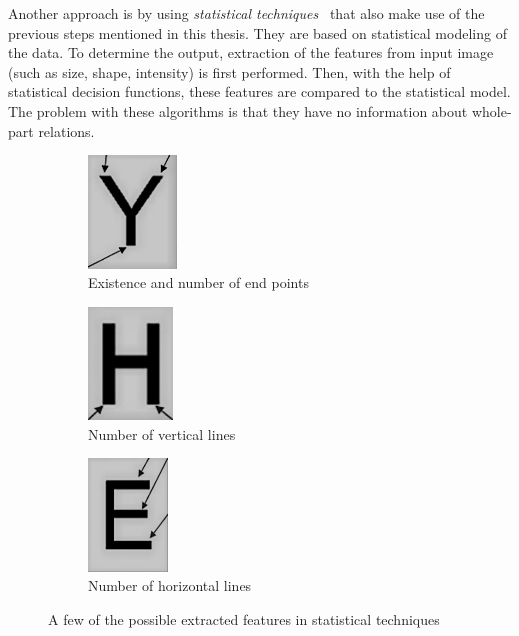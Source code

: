 Another approach is by using \emph{statistical techniques}~\citep{characterClassification} that also make use of the previous steps mentioned in this thesis. They are based on statistical modeling of the data. To determine the output, extraction of the features from input image (such as size, shape, intensity) is first performed. Then, with the help of statistical decision functions, these features are compared to the statistical model. The problem with these algorithms is that they have no information about whole-part relations. 

\begin{figure}[H]
\hspace*{\fill} %
\begin{subfigure}{0.30\textwidth}
\includegraphics[width=\linewidth,height=30mm]{img/statis_endPoint.jpg}
\caption{Existence and number of end points} \label{fig:1b}
\end{subfigure}
\hspace*{\fill} %
\begin{subfigure}{0.30\textwidth}
\includegraphics[width=\linewidth,height=30mm]{img/statis_vertical.jpg}
\caption{Number of vertical lines} \label{fig:1c}
\end{subfigure}
\begin{subfigure}{0.30\textwidth}
\includegraphics[width=\linewidth,height=30mm]{img/statis_horizontal.jpg}
\caption{Number of horizontal lines} \label{fig:1c}
\end{subfigure}
\caption{A few of the possible extracted features in statistical techniques \citep{vithlani2015structural}} \label{fig:1}
\end{figure}

